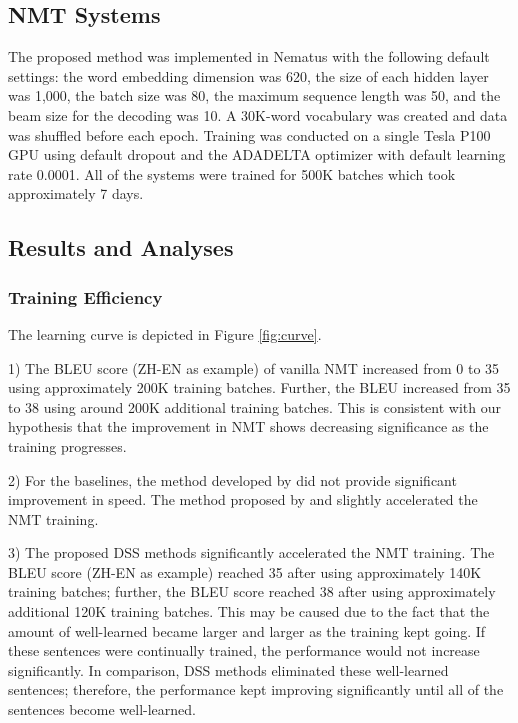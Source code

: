 \documentclass[11pt,a4paper]{article}
\begin{document}
\subsection{NMT Systems}
The proposed method was implemented in Nematus \citep{sennrich2017nematus} with the following default settings:  the word embedding dimension was 620, the size of each hidden layer was 1,000, the batch size was 80, the maximum sequence length was 50, and the beam size for the decoding was 10.   A 30K-word vocabulary was created and data was shuffled before each epoch. Training was conducted on a single Tesla P100 GPU using default dropout and  the ADADELTA optimizer \citep{zeiler2012adadelta} with default learning rate 0.0001. All of the systems were trained for 500K batches which took approximately 7 days. 



\subsection{Results and Analyses}

\subsubsection{Training Efficiency}
The learning curve is depicted in Figure \ref{fig:curve}.  

1) The BLEU score (ZH-EN as example) of vanilla NMT increased from 0 to 35 using approximately 200K training batches.  Further, the BLEU increased from 35 to 38 using around 200K additional training batches. This is consistent with our hypothesis that the improvement in NMT shows decreasing significance as the training progresses.

2) For the baselines, the method developed by \citet{DBLP:journals/corr/KocmiB17aa} did not provide significant improvement in speed. The method proposed by \citet{vanderwees-bisazza-monz:2017:EMNLP2017} and \citet{zhang-EtAl:2017:I17-2} slightly accelerated the NMT training. 

3) The proposed DSS methods significantly accelerated the NMT training. The BLEU score (ZH-EN as example) reached 35 after using approximately 140K training batches; further, the BLEU score reached 38 after using approximately additional 120K training batches. This may be caused due to the fact that the amount of well-learned became larger and larger as the training kept going. If these sentences were continually trained, the performance would not increase significantly. In comparison, DSS methods eliminated these well-learned sentences; therefore, the performance kept improving significantly until all of the sentences become well-learned. 
\end{document}
